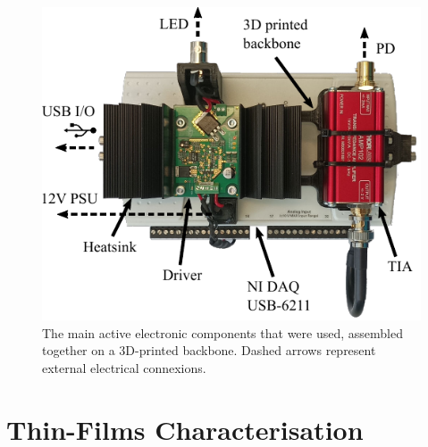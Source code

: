 \begin{figure}
	\centering
	\includegraphics{1_main_matter/thin_film_figures/optoelectronics/elec_setup_comp.pdf}
	\caption[Electronic setup.]{The main active electronic components that were used, assembled together on a 3D-printed backbone. Dashed arrows represent external electrical connexions.}
	\label{fig:thin_film:opto_elec:elec_setup}
\end{figure}

\section{Thin-Films Characterisation}\label{sect:thin_film:results}

